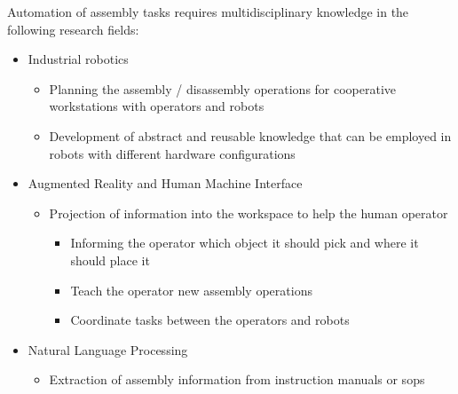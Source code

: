 Automation of assembly tasks requires multidisciplinary knowledge in the following research fields:

\begin{itemize}
	\item Industrial robotics
	\begin{itemize}
		\item Planning the assembly / disassembly operations for cooperative workstations with operators and robots
		\item Development of abstract and reusable knowledge that can be employed in robots with different hardware configurations
	\end{itemize}

	\item Augmented Reality and Human Machine Interface
	\begin{itemize}
		\item Projection of information into the workspace to help the human operator
		\begin{itemize}
			\item Informing the operator which object it should pick and where it should place it
			\item Teach the operator new assembly operations
			\item Coordinate tasks between the operators and robots
		\end{itemize}
	\end{itemize}



	\item Natural Language Processing
	\begin{itemize}
		\item Extraction of assembly information from instruction manuals or \glspl{sop}
	\end{itemize}
\end{itemize}



